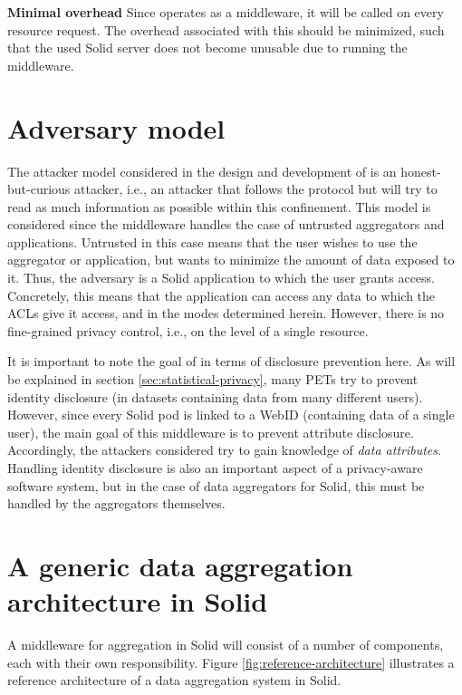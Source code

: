 \noindent \textbf{Minimal overhead} Since \middleware{} operates as a middleware, it will be called on every resource request. The overhead associated with this should be minimized, such that the used Solid server does not become unusable due to running the middleware.

\section{Adversary model}
\label{sec:attacker-model}
The attacker model considered in the design and development of \middleware{} is an honest-but-curious attacker, i.e., an attacker that follows the protocol but will try to read as much information as possible within this confinement. This model is considered since the middleware handles the case of untrusted aggregators and applications. Untrusted in this case means that the user wishes to use the aggregator or application, but wants to minimize the amount of data exposed to it. Thus, the adversary is a Solid application to which the user grants access. Concretely, this means that the application can access any data to which the \gls{ACL}s give it access, and in the modes determined herein. However, there is no fine-grained privacy control, i.e., on the level of a single resource. 

It is important to note the goal of \middleware{} in terms of disclosure prevention here. As will be explained in section \ref{sec:statistical-privacy}, many \gls{PETs} try to prevent identity disclosure (in datasets containing data from many different users). However, since every Solid pod is linked to a WebID (containing data of a single user), the main goal of this middleware is to prevent attribute disclosure. Accordingly, the attackers considered try to gain knowledge of \textit{data attributes}. Handling identity disclosure is also an important aspect of a privacy-aware software system, but in the case of data aggregators for Solid, this must be handled by the aggregators themselves.

\section{A generic data aggregation architecture in Solid}
A middleware for aggregation in Solid will consist of a number of components, each with their own responsibility. Figure \ref{fig:reference-architecture} illustrates a reference architecture of a data aggregation system in Solid. 

